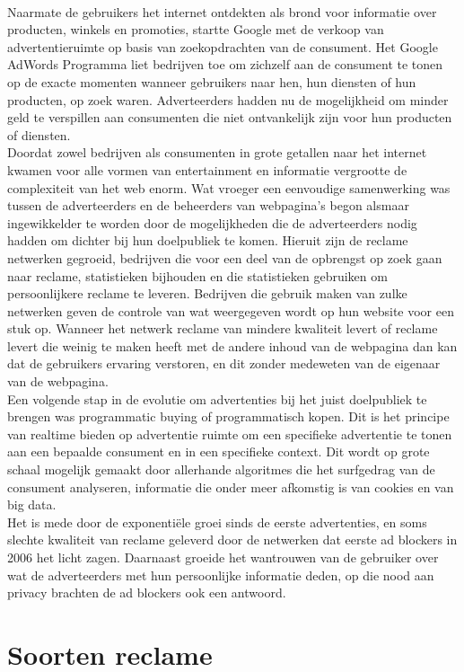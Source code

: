 \documentclass[pdftex,a4paper,12pt,twoside]{report}
\begin{document}
\\
Naarmate de gebruikers het internet ontdekten als brond voor informatie over producten, winkels en promoties, startte Google met de verkoop van advertentieruimte op basis van zoekopdrachten van de consument. Het Google AdWords Programma liet bedrijven toe om zichzelf aan de consument te tonen op de exacte momenten wanneer gebruikers naar hen, hun diensten of hun producten, op zoek waren. Adverteerders hadden nu de mogelijkheid om minder geld te verspillen aan consumenten die niet ontvankelijk zijn voor hun producten of diensten.
\\
Doordat zowel bedrijven als consumenten in grote getallen naar het internet kwamen voor alle vormen van entertainment en informatie vergrootte de complexiteit van het web enorm. Wat vroeger een eenvoudige samenwerking was tussen de adverteerders en de beheerders van webpagina’s begon alsmaar ingewikkelder te worden door de mogelijkheden die de adverteerders nodig hadden om dichter bij hun doelpubliek te komen. Hieruit zijn de reclame netwerken gegroeid, bedrijven die voor een deel van de opbrengst op zoek gaan naar reclame, statistieken bijhouden en die statistieken gebruiken om persoonlijkere reclame te leveren. Bedrijven die gebruik maken van zulke netwerken geven de controle van wat weergegeven wordt op hun website voor een stuk op. Wanneer het netwerk reclame van mindere kwaliteit levert of reclame levert die weinig te maken heeft met de andere inhoud van de webpagina dan kan dat de gebruikers ervaring verstoren, en dit zonder medeweten van de eigenaar van de webpagina.
\\
Een volgende stap in de evolutie om advertenties bij het juist doelpubliek te brengen was programmatic buying of programmatisch kopen. Dit is het principe van realtime bieden op advertentie ruimte om een specifieke advertentie te tonen aan een bepaalde consument en in een specifieke context. Dit wordt op grote schaal mogelijk gemaakt door allerhande algoritmes die het surfgedrag van de consument analyseren, informatie die onder meer afkomstig is van cookies en van big data.
\\
Het is mede door de exponentiële groei sinds de eerste advertenties, en soms slechte kwaliteit van reclame geleverd door de netwerken dat eerste ad blockers in 2006 het licht zagen. Daarnaast groeide het wantrouwen van de gebruiker over wat de adverteerders met hun persoonlijke informatie deden, op die nood aan privacy brachten de ad blockers ook een antwoord.

\section{Soorten reclame}
\label{sec:Soorten reclame}
\end{document}
